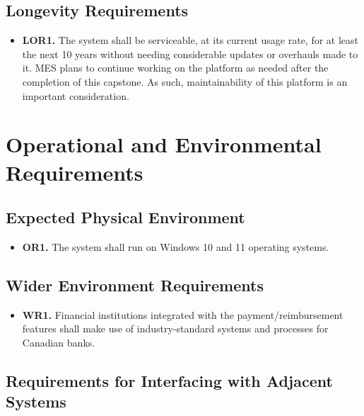 \documentclass[12pt]{article}
\begin{document}
\subsection{Longevity Requirements}

\label{LOR}

\begin{itemize}
    \item \textbf{LOR1.} The system shall be serviceable, at its current usage rate, for at least the next 10 years without needing considerable updates or overhauls made to it. MES plans to continue working on the platform as needed after the completion of this capstone. As such, maintainability of this platform is an important consideration.
\end{itemize}

\section{Operational and Environmental Requirements}

\label{OpsandEnv}

\subsection{Expected Physical Environment}

\label{OR1}

\begin{itemize}
    \item \textbf{OR1.} The system shall run on Windows 10 and 11 operating systems.
\end{itemize}

\subsection{Wider Environment Requirements}

\label{WR}

\begin{itemize}
    \item \textbf{WR1.} Financial institutions integrated with the payment/reimbursement features shall make use of industry-standard systems and processes for Canadian banks.
\end{itemize}

\subsection{Requirements for Interfacing with Adjacent Systems}
\end{document}
